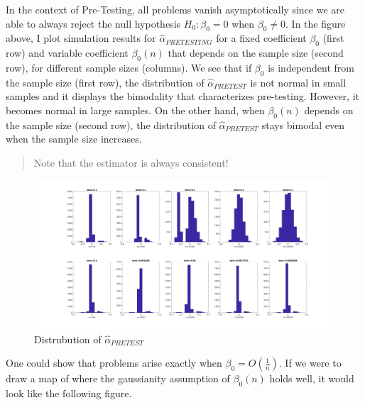 \documentclass[12pt,]{book}
\begin{document}
In the context of Pre-Testing, all problems vanish asymptotically since we are able to always reject the null hypothesis \(H_0:\beta_0=0\) when \(\beta_0 \neq 0\). In the figure above, I plot simulation results for \(\hat \alpha_{PRETESTING}\) for a fixed coefficient \(\beta_0\) (first row) and variable coefficient \(\beta_0(n)\) that depends on the sample size (second row), for different sample sizes (columns). We see that if \(\beta_0\) is independent from the sample size (first row), the distribution of \(\hat \alpha_{PRETEST}\) is not normal in small samples and it displays the bimodality that characterizes pre-testing. However, it becomes normal in large samples. On the other hand, when \(\beta_0(n)\) depends on the sample size (second row), the distribution of \(\hat \alpha_{PRETEST}\) stays bimodal even when the sample size increases.

\begin{quote}
Note that the estimator is always consistent!
\end{quote}

\begin{figure}
\centering
\includegraphics{figures/Fig_624.png}
\caption{Distrubution of \(\hat \alpha_{PRETEST}\)}
\end{figure}

One could show that problems arise exactly when \(\beta_0 = O\left( \frac{1}{n}\right)\). If we were to draw a map of where the gaussianity assumption of \(\beta_0(n)\) holds well, it would look like the following figure.
\end{document}
